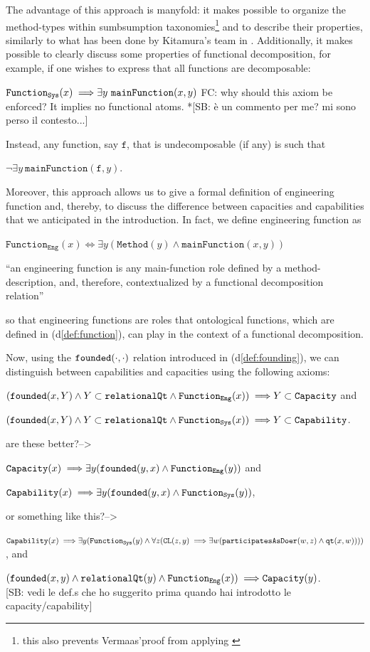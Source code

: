 \documentclass[sw]{iosart2x}
\newcommand{\bflist}{\begin{list}{}{\setlength{\topsep}{2mm}\setlength{\partopsep}{0mm}\setlength{\parsep}{0mm}\setlength{\leftmargin}{9mm}\setlength{\labelwidth}{8mm}}}
\newcommand{\eflist}{\end{list}}
\newcommand{\AxLabel}{\textrm{a}}
\newcommand{\DefLabel}{\textrm{d}}
\newcounter{cntax}
\newcommand{\myax}[1]{\refstepcounter{cntax}\begin{small}{\bf \AxLabel\thecntax\label{ax:#1}}\end{small}}
\newcounter{cntdef}
\newcommand{\mydf}[1]{\refstepcounter{cntdef}\begin{small}{\bf \DefLabel\thecntdef\label{def:#1}}\end{small}}
\newcommand{\mytext}[1]{``#1''}
\newcommand{\refdf}[1]{({\DefLabel}\ref{#1})}
\newcommand{\generalStyle}[1]{\texttt{#1}}
\newcommand{\biRel}[3]{\generalStyle{#1}(#2,#3)}
\newcommand{\uniRel}[2]{\generalStyle{#1}(#2)}
\newcommand{\uniRelPar}[3]{\generalStyle{#1}_{\generalStyle{#3}}(#2)}
\newcommand{\cst}[1]{\ensuremath{\mathtt{#1}}}
\newcommand{\myiff}{\Longleftrightarrow}
\newcommand{\myfi}{\hspace{0.9mm} \Longrightarrow}
\newcommand{\DOLCEQualityDirect}[2]{\biRel{qt}{#1}{#2}}
\newcommand{\DOLCECLby}[2]{\biRel{CL}{#1}{#2}}
\newcommand{\RelationalQualityClass}{\generalStyle{relationalQt}}
\newcommand{\CapabilityClass}{\generalStyle{Capability}}
\newcommand{\CapacityClass}{\generalStyle{Capacity}}
\newcommand{\Capability}[1]{\uniRel{Capability}{#1}}
\newcommand{\Capacity}[1]{\uniRel{Capacity}{#1}}
\newcommand{\RelationalQuality}[1]{\uniRel{relationalQt}{#1}}
\newcommand{\Method}[1]{\uniRel{Method}{#1}}
\newcommand{\FunctionSys}[1]{\uniRelPar{Function}{#1}{Sys}}
\newcommand{\FunctionEng}[1]{\uniRelPar{Function}{#1}{Eng}}
\newcommand{\founded}[2]{\biRel{\foundedTerm{passive}}{#1}{#2}}
\newcommand{\participateAsDoer}[2]{\biRel{participatesAsDoer}{#1}{#2}}
\newcommand{\mainFunction}[2]{\biRel{mainFunction}{#1}{#2}}
\newcommand{\foundedTerm}[1]{%
  \ifthenelse{\equal{#1}{passive}}{founded}{%
    \ifthenelse{\equal{#1}{verb}}{found}{%
      \ifthenelse{\equal{#1}{gerund}}{founding}{%
        ERROR!%
      }%
    }%
  }%
}
\newcommand{\TODO}[1]{{\color{red} #1}}
\begin{document}
The advantage of this approach is manyfold: it makes  possible to organize the method-types within sumbsumption taxonomies\footnote{this also prevents Vermaas'proof from applying \cite{vermaasFormalImpossibilityAnalysing2013}} and to describe their properties, similarly to what has been done by Kitamura's team in  \cite{kitamuraOntologybasedDescriptionFunctional2003}.
Additionally, it makes possible to clearly discuss some properties of functional decomposition, for example, if one wishes to express that all functions are decomposable:
\bflist
\item[] $\FunctionSys{x} \myfi \exists y~ \mainFunction{x}{y}$ \TODO{FC: why should this axiom be enforced? It implies no functional atoms. *[SB: è un commento per me? mi sono perso il contesto...]}
\eflist
Instead, any function, say $\cst{f}$, that is undecomposable (if any) is such that
\bflist
\item[] $\neg \exists y~\mainFunction{\cst{f}}{y}$.
\eflist
Moreover, this approach allows us to give a formal definition of engineering function and, thereby, to discuss the difference between capacities and capabilities that we anticipated in the introduction. 
In fact, we define engineering function as
\bflist
  \item[\mydf{engfunction}]  $ \FunctionEng{x} \myiff \exists y (\Method{y} \land \mainFunction{x}{y}) $
  \item[] \mytext{an engineering function is any main-function role defined by a method-description, and, therefore, contextualized by a functional decomposition relation}
\eflist
so that engineering functions are roles that ontological functions, which are defined in \refdf{def:function}, can play in the context of a functional decomposition.

Now, using the $\founded{\cdot}{\cdot}$ relation introduced in \refdf{def:founding}, we can distinguish between capabilities and capacities using the following axioms:
\bflist
  \item[\myax{capacityCostr}] $ (\founded{x}{Y} \land Y \subset \RelationalQualityClass \land \FunctionEng{x}) \myfi Y \subset \CapacityClass$ and
  \item[\myax{capabilityCostr}] $ (\founded{x}{Y} \land Y \subset \RelationalQualityClass \land \FunctionSys{x}) \myfi Y \subset \CapabilityClass$.
\eflist

\TODO{ are these better?-->
\bflist
  \item[\myax{capacityCostrBis}] $ \Capacity{x} \myfi \exists y (\founded{y}{x} \land \FunctionEng{y})$ and
  \item[\myax{capabilityCostrBis}] $ \Capability{x} \myfi \exists y (\founded{y}{x} \land \FunctionSys{y})$,
\eflist
}
\TODO{ or something like this?-->
\bflist
  \item[\myax{capabilityCostrTris}] $ \Capability{x} \myfi \exists y (\FunctionSys{y} \land \forall z(\DOLCECLby{z}{y} \myfi \exists w(\participateAsDoer{w}{z} \land \DOLCEQualityDirect{x}{w})))$, and
  \item[\myax{capacityCostrTris}] $ (\founded{x}{y} \land \RelationalQuality{y} \land \FunctionEng{x}) \myfi \Capacity{y}$. \\
\TODO{[SB: vedi le def.s che ho suggerito prima quando hai introdotto le capacity/capability]}
\eflist
}
\end{document}
